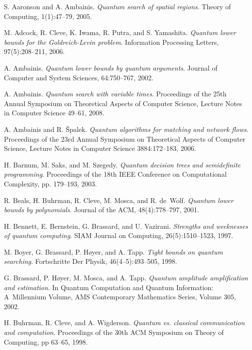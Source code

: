 \documentclass{article}
\begin{document}
\begin{thebibliography}{99}
%
 S. Aaronson and A. Ambainis. 
\emph{Quantum search of spatial regions}.
Theory of Computing, 1(1):47--79, 2005.

%
 M. Adcock, R. Cleve, K. Iwama, R. Putra, and S. Yamashita. 
\emph{Quantum lower bounds for the Goldreich-Levin problem}. 
Information Processing Letters, 97(5):208--211, 2006.

%
 A. Ambainis. 
\emph{Quantum lower bounds by quantum arguments}. 
Journal of Computer and System Sciences, 64:750--767, 2002.

%
 A. Ambainis. 
\emph{Quantum search with variable times}.
Proceedings of the 25th Annual 
Symposium on Theoretical Aspects of Computer Science,
Lecture Notes in Computer Science 49--61, 2008.

%
 A. Ambainis and R. \v{S}palek. 
\emph{Quantum algorithms for matching and network flows}. 
Proceedings of the 23rd Annual 
Symposium on Theoretical Aspects of Computer Science,
Lecture Notes in Computer Science 3884:172--183, 2006.

%
 H. Barnum, M. Saks, and M. Szegedy. 
\emph{Quantum decision trees and semidefinite programming}. 
Proceedings of the 18th IEEE Conference on Computational Complexity, 
pp. 179--193, 2003.

%
 R. Beals, H. Buhrman, R. Cleve, M. Mosca, and R. de~Wolf. 
\emph{Quantum lower bounds by polynomials}. 
Journal of the ACM, 48(4):778--797, 2001.

%
 H. Bennett, E. Bernstein, G. Brassard, and U. Vazirani. 
\emph{Strengths and weeknesses of quantum computing}. 
SIAM Journal on Computing, 26(5):1510--1523, 1997.

%
 M. Boyer, G. Brassard, P. H\o yer, and A. Tapp. 
\emph{Tight bounds on quantum searching}. 
Fortschritte Der Physik, 46(4--5):493--505, 1998.

%
 G. Brassard, P. H\o yer, M. Mosca, and A. Tapp. 
\emph{Quantum amplitude amplification and estimation}. 
In Quantum Computation and Quantum Information: 
{A}~Millennium Volume, AMS Contemporary Mathematics Series, 
Volume 305, 2002.

%
 H. Buhrman, R. Cleve, and A. Wigderson. 
\emph{Quantum vs.{} classical communication and computation}. 
Proceedings of the 30th ACM Symposium on Theory of Computing, pp 63--65, 1998. 


\end{thebibliography}
\end{document}
